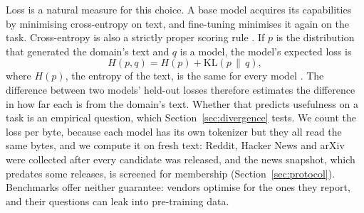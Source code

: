 \documentclass[10pt]{article}
\begin{document}
Loss is a natural measure for this choice. A base model acquires its capabilities by minimising
cross-entropy on text, and fine-tuning minimises it again on the task. Cross-entropy is also a
strictly proper scoring rule \citep{gneiting2007scoring}. If $p$ is the distribution that generated
the domain's text and $q$ is a model, the model's expected loss is
\begin{equation}
H(p,q) = H(p) + \mathrm{KL}(p\,\|\,q),
\label{eq:ce}
\end{equation}
where $H(p)$, the entropy of the text, is the same for every model \citep{cover2006elements}. The
difference between two models' held-out losses therefore estimates the difference in how far each is
from the domain's text. Whether that predicts usefulness on a task is an empirical question, which
Section~\ref{sec:divergence} tests. We count the loss per byte, because each model has its own
tokenizer but they all read the same bytes, and we compute it on fresh text: Reddit, Hacker News
and arXiv were collected after every candidate was released, and the news snapshot, which predates
some releases, is screened for membership (Section~\ref{sec:protocol}). Benchmarks offer neither
guarantee: vendors optimise for the ones they report, and their questions can leak into
pre-training data.
\end{document}
